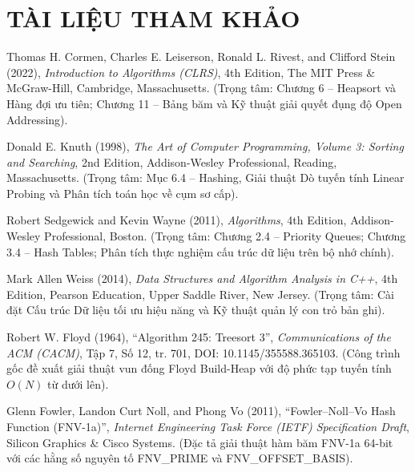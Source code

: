 \documentclass[14pt,a4paper]{extarticle}
\begin{document}
\newpage
\section*{TÀI LIỆU THAM KHẢO}
{}

\begin{enumerate}[label={[\arabic*]}, leftmargin=*, itemsep=6pt, parsep=0pt, topsep=4pt]
    \item Thomas H. Cormen, Charles E. Leiserson, Ronald L. Rivest, and Clifford Stein (2022), \textit{Introduction to Algorithms (CLRS)}, 4th Edition, The MIT Press \& McGraw-Hill, Cambridge, Massachusetts. (Trọng tâm: Chương 6 -- Heapsort và Hàng đợi ưu tiên; Chương 11 -- Bảng băm và Kỹ thuật giải quyết đụng độ Open Addressing).
    
    \item Donald E. Knuth (1998), \textit{The Art of Computer Programming, Volume 3: Sorting and Searching}, 2nd Edition, Addison-Wesley Professional, Reading, Massachusetts. (Trọng tâm: Mục 6.4 -- Hashing, Giải thuật Dò tuyến tính Linear Probing và Phân tích toán học về cụm sơ cấp).
    
    \item Robert Sedgewick and Kevin Wayne (2011), \textit{Algorithms}, 4th Edition, Addison-Wesley Professional, Boston. (Trọng tâm: Chương 2.4 -- Priority Queues; Chương 3.4 -- Hash Tables; Phân tích thực nghiệm cấu trúc dữ liệu trên bộ nhớ chính).
    
    \item Mark Allen Weiss (2014), \textit{Data Structures and Algorithm Analysis in C++}, 4th Edition, Pearson Education, Upper Saddle River, New Jersey. (Trọng tâm: Cài đặt Cấu trúc Dữ liệu tối ưu hiệu năng và Kỹ thuật quản lý con trỏ bản ghi).
    
    \item Robert W. Floyd (1964), ``Algorithm 245: Treesort 3'', \textit{Communications of the ACM (CACM)}, Tập 7, Số 12, tr. 701, DOI: 10.1145/355588.365103. (Công trình gốc đề xuất giải thuật vun đống Floyd Build-Heap với độ phức tạp tuyến tính $O(N)$ từ dưới lên).
    
    \item Glenn Fowler, Landon Curt Noll, and Phong Vo (2011), ``Fowler--Noll--Vo Hash Function (FNV-1a)'', \textit{Internet Engineering Task Force (IETF) Specification Draft}, Silicon Graphics \& Cisco Systems. (Đặc tả giải thuật hàm băm FNV-1a 64-bit với các hằng số nguyên tố FNV\_PRIME và FNV\_OFFSET\_BASIS).
    

\end{enumerate}
\end{document}
